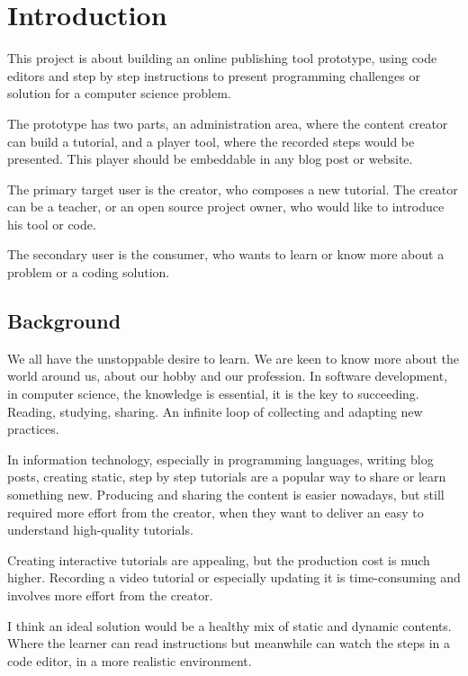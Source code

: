 \chapter{Introduction}\label{C:intro}

This project is about building an online publishing tool prototype, using code editors and step by step instructions to present programming challenges or solution for a computer science problem.

The prototype has two parts, an administration area, where the content creator can build a tutorial, and a player tool, where the recorded steps would be presented. This player should be embeddable in any blog post or website.

The primary target user is the creator, who composes a new tutorial. The creator can be a teacher, or an open source project owner, who would like to introduce his tool or code.

The secondary user is the consumer, who wants to learn or know more about a problem or a coding solution.

\section{Background}

We all have the unstoppable desire to learn. We are keen to know more about the world around us, about our hobby and our profession. In software development, in computer science, the knowledge is essential, it is the key to succeeding. Reading, studying, sharing. An infinite loop of collecting and adapting new practices.

In information technology, especially in programming languages, writing blog posts, creating static, step by step tutorials are a popular way to share or learn something new. Producing and sharing the content is easier nowadays, but still required more effort from the creator, when they want to deliver an easy to understand high-quality tutorials.

Creating interactive tutorials are appealing, but the production cost is much higher. Recording a video tutorial or especially updating it is time-consuming and involves more effort from the creator.

I think an ideal solution would be a healthy mix of static and dynamic contents. Where the learner can read instructions but meanwhile can watch the steps in a code editor, in a more realistic environment.
